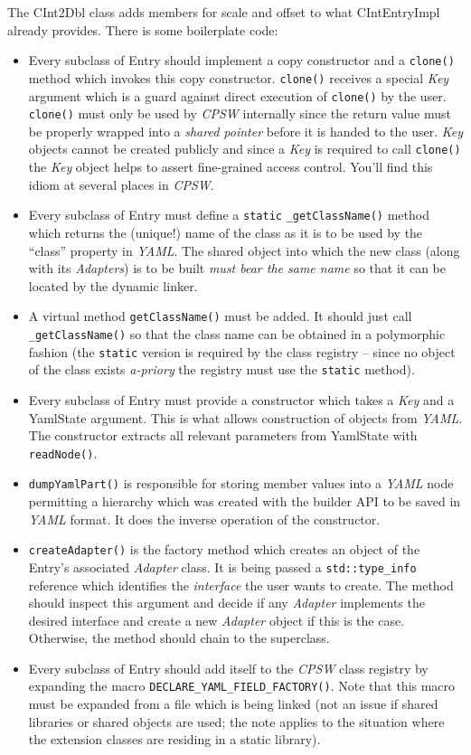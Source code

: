\documentclass[10pt]{article}
\newcommand{\ita}[1]{\emph{#1}}
\newcommand{\cpsw}      {\ita {CPSW}}
\newcommand{\yaml}      {\ita {YAML}}
\newcommand{\cod}[1] {{\tt#1}}
\begin{document}
The CInt2Dbl class adds members for scale and offset to what CIntEntryImpl
already provides. There is some boilerplate code:
\begin{itemize}
\item Every subclass of Entry should implement a copy constructor and a \cod{clone()}
      method which invokes this copy constructor. \cod{clone()} receives a special
      {\em Key} argument which is a guard against direct execution of \cod{clone()}
      by the user. \cod{clone()} must only be used by \cpsw{} internally since the
      return value must be properly wrapped into a {\em shared pointer} before it
      is handed to the user. {\em Key} objects cannot be created publicly and since
      a {\em Key} is required to call \cod{clone()} the {\em Key} object helps to
      assert fine-grained access control. You'll find this idiom at several places
      in \cpsw{}.
\item Every subclass of Entry must define a \cod{static} \cod{\_getClassName()}
      method which returns the (unique!) name of the class as it is to be used
      by the ``class'' property in \yaml{}. The shared object into which the new
      class (along with its {\em Adapters}) is to be built {\em must bear the same name}
      so that it can be located by the dynamic linker.
\item A virtual method \cod{getClassName()} must be added. It should just 
      call \cod{\_getClassName()} so that the class name can be obtained in a polymorphic
      fashion (the \cod{static} version is required by the class registry -- since
      no object of the class exists {\em a-priory} the registry must use the
      \cod{static} method).
\item Every subclass of Entry must provide a constructor which takes a {\em Key}
      and a YamlState argument. This is what allows construction of objects from
      \yaml{}. The constructor extracts all relevant parameters from YamlState 
      with \cod{readNode()}.
\item \cod{dumpYamlPart()} is responsible for storing member values into a \yaml{}
      node permitting a hierarchy which was created with the builder API to be saved
      in \yaml{} format. It does the inverse operation of the constructor.
\item \cod{createAdapter()} is the factory method which creates an object of the
      Entry's associated {\em Adapter} class. It is being passed a \cod{std::type\_info}
      reference which identifies the {\em interface} the user wants to create.
      The method should inspect this argument and decide if any {\em Adapter}
      implements the desired interface and create a new {\em Adapter} object if this
      is the case. Otherwise, the method should chain to the superclass.
\item Every subclass of Entry should add itself to the \cpsw{} class registry by
      expanding the macro \cod{DECLARE\_YAML\_FIELD\_FACTORY()}. Note that this
      macro must be expanded from a file which is being linked (not an issue if
      shared libraries or shared objects are used; the note applies to the situation
      where the extension classes are residing in a static library).
\end{itemize}
\end{document}
